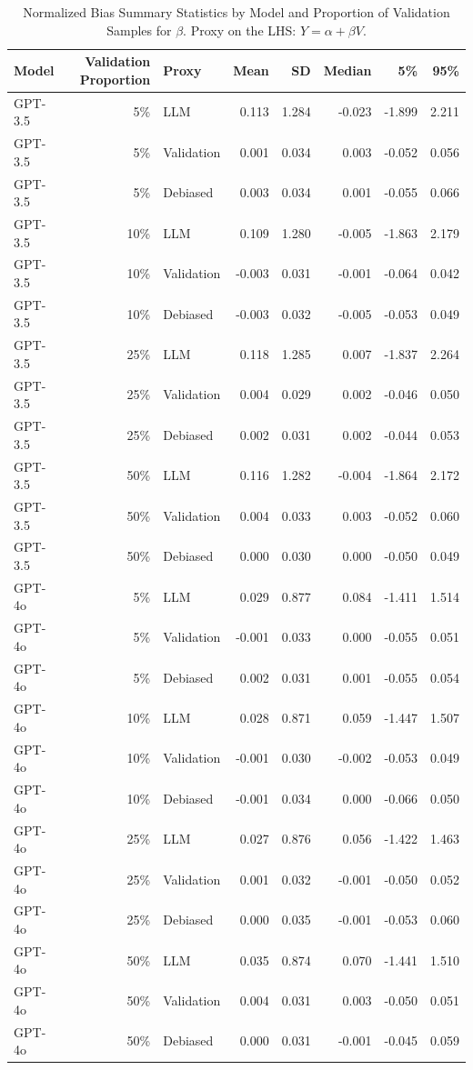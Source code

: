 \begin{table}

\caption{Normalized Bias Summary Statistics by Model and Proportion of Validation Samples for $\beta$. Proxy on the LHS: $Y = \alpha + \beta V$.}
\centering
\begin{tabular}[t]{lrlrrrrr}
\toprule
Model & Validation Proportion & Proxy & Mean & SD & Median & 5\% & 95\%\\
\midrule
GPT-3.5 & 5\% & LLM & 0.113 & 1.284 & -0.023 & -1.899 & 2.211\\
GPT-3.5 & 5\% & Validation & 0.001 & 0.034 & 0.003 & -0.052 & 0.056\\
GPT-3.5 & 5\% & Debiased & 0.003 & 0.034 & 0.001 & -0.055 & 0.066\\
GPT-3.5 & 10\% & LLM & 0.109 & 1.280 & -0.005 & -1.863 & 2.179\\
GPT-3.5 & 10\% & Validation & -0.003 & 0.031 & -0.001 & -0.064 & 0.042\\
GPT-3.5 & 10\% & Debiased & -0.003 & 0.032 & -0.005 & -0.053 & 0.049\\
GPT-3.5 & 25\% & LLM & 0.118 & 1.285 & 0.007 & -1.837 & 2.264\\
GPT-3.5 & 25\% & Validation & 0.004 & 0.029 & 0.002 & -0.046 & 0.050\\
GPT-3.5 & 25\% & Debiased & 0.002 & 0.031 & 0.002 & -0.044 & 0.053\\
GPT-3.5 & 50\% & LLM & 0.116 & 1.282 & -0.004 & -1.864 & 2.172\\
GPT-3.5 & 50\% & Validation & 0.004 & 0.033 & 0.003 & -0.052 & 0.060\\
GPT-3.5 & 50\% & Debiased & 0.000 & 0.030 & 0.000 & -0.050 & 0.049\\
GPT-4o & 5\% & LLM & 0.029 & 0.877 & 0.084 & -1.411 & 1.514\\
GPT-4o & 5\% & Validation & -0.001 & 0.033 & 0.000 & -0.055 & 0.051\\
GPT-4o & 5\% & Debiased & 0.002 & 0.031 & 0.001 & -0.055 & 0.054\\
GPT-4o & 10\% & LLM & 0.028 & 0.871 & 0.059 & -1.447 & 1.507\\
GPT-4o & 10\% & Validation & -0.001 & 0.030 & -0.002 & -0.053 & 0.049\\
GPT-4o & 10\% & Debiased & -0.001 & 0.034 & 0.000 & -0.066 & 0.050\\
GPT-4o & 25\% & LLM & 0.027 & 0.876 & 0.056 & -1.422 & 1.463\\
GPT-4o & 25\% & Validation & 0.001 & 0.032 & -0.001 & -0.050 & 0.052\\
GPT-4o & 25\% & Debiased & 0.000 & 0.035 & -0.001 & -0.053 & 0.060\\
GPT-4o & 50\% & LLM & 0.035 & 0.874 & 0.070 & -1.441 & 1.510\\
GPT-4o & 50\% & Validation & 0.004 & 0.031 & 0.003 & -0.050 & 0.051\\
GPT-4o & 50\% & Debiased & 0.000 & 0.031 & -0.001 & -0.045 & 0.059\\
\bottomrule
\end{tabular}
\end{table}
